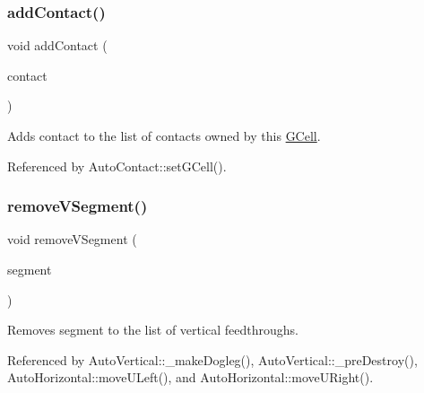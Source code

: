 \mbox{\label{classKatabatic_1_1GCell_a2b84aab620bfca1064e988e94e7b9c59}} 
\subsubsection{\texorpdfstring{add\+Contact()}{addContact()}}
{\footnotesize\ttfamily void add\+Contact (\begin{DoxyParamCaption}\item[{\mbox{\hyperlink{classKatabatic_1_1AutoContact}{Auto\+Contact}} $\ast$}]{contact }\end{DoxyParamCaption})\hspace{0.3cm}{\ttfamily [inline]}}

Adds {\ttfamily contact} to the list of contacts owned by this \mbox{\hyperlink{classKatabatic_1_1GCell}{G\+Cell}}. 

Referenced by Auto\+Contact\+::set\+G\+Cell().

\mbox{\label{classKatabatic_1_1GCell_abe128484d8aa063198292a88c63f2bba}} 
\subsubsection{\texorpdfstring{remove\+V\+Segment()}{removeVSegment()}}
{\footnotesize\ttfamily void remove\+V\+Segment (\begin{DoxyParamCaption}\item[{\mbox{\hyperlink{classKatabatic_1_1AutoSegment}{Auto\+Segment}} $\ast$}]{segment }\end{DoxyParamCaption})}

Removes {\ttfamily segment} to the list of vertical feedthroughs. 

Referenced by Auto\+Vertical\+::\+\_\+make\+Dogleg(), Auto\+Vertical\+::\+\_\+pre\+Destroy(), Auto\+Horizontal\+::move\+U\+Left(), and Auto\+Horizontal\+::move\+U\+Right().

\mbox{\label{classKatabatic_1_1GCell_aff76aa96214c0efcf13186b8b3e5c852}} 

